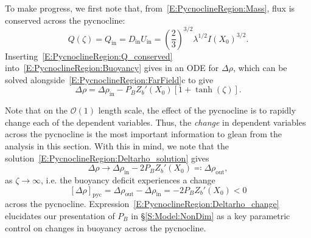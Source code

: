 \documentclass[openacc]{rsproca_new}%
\newcommand{\order}[1]{\mathcal{O}(#1)}
\newcommand{\Pb}{\textit{P}_B}  %
\renewcommand{\in}{\text{in}} %
\newcommand{\out}{\text{out}}
\begin{document}
To make progress, we first note that, from~\eqref{E:PycnoclineRegion:Mass}, flux is conserved across the pycnocline:
\begin{equation}\label{E:PycnoclineRegion:Q_conserved}
Q(\zeta) = Q_{\in} = D_{\in} U_{\in}  =\left(\frac{2}{3}\right)^{3/2} \lambda^{1/2}I(X_0)^{3/2}.
\end{equation}
Inserting~\eqref{E:PycnoclineRegion:Q_conserved} into~\eqref{E:PycnoclineRegion:Buoyancy} gives in an ODE for $\Delta \rho$, which can be solved alongside~\eqref{E:PycnoclineRegion:FarField}c to give
\begin{equation}\label{E:PycnoclineRegion:Deltarho_solution}
\Delta \rho = \Delta \rho_{\in} - \Pb Z_b'(X_0) \left[1 + \tanh(\zeta)\right].
\end{equation} 

Note that on the $\order{1}$ length scale, the effect of the pycnocline is to rapidly change each of the dependent variables. Thus, the \textit{change} in dependent variables across the pycnocline is the most important information to glean from the analysis in this section. With this in mind, we note that the solution~\eqref{E:PycnoclineRegion:Deltarho_solution} gives
\begin{equation}\label{E:PycnoclineRegion:Deltarho_limit}
\Delta \rho \to \Delta \rho_{\in} - 2 \Pb Z_b'(X_0)  \eqcolon \Delta \rho_\out,
\end{equation}
as $\zeta \to \infty$, i.e. the buoyancy deficit experiences a change
\begin{equation}\label{E:PycnoclineRegion:Deltarho_change}
\left[\Delta \rho\right]_{\text{pyc}} = \Delta \rho_\out - \Delta \rho_\in = - 2 \Pb Z_b'(X_0) < 0
\end{equation}
across the pycnocline. Expression~\eqref{E:PycnoclineRegion:Deltarho_change} elucidates our presentation of $\Pb$ in \S\ref{S:Model:NonDim} as a key parametric control on changes in buoyancy across the pycnocline.
\end{document}
